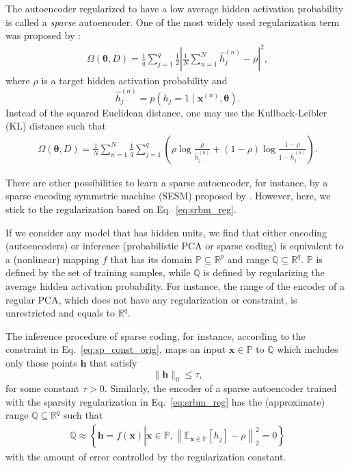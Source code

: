 \documentclass{now}
\newcommand{\vect}[1]{\mathbf{#1}}
\newcommand{\vects}[1]{\boldsymbol{#1}}
\newcommand{\vh}[0]{\vect{h}}
\newcommand{\vx}[0]{\vect{x}}
\newcommand{\TT}[0]{{\vects{\theta}}}
\newcommand{\QQ}[0]{\mathbb{Q}}
\newcommand{\PP}[0]{\mathbb{P}}
\newcommand{\RR}[0]{\mathbb{R}}
\newcommand{\E}[0]{\mathbb{E}}
\begin{document}
The autoencoder regularized to have a low average hidden activation probability
is called a \textit{sparse} autoencoder. One of the most widely used
regularization term was proposed by \citet{Lee2007}:
\begin{align}
    \label{eq:srbm_reg}
    \Omega(\TT, D) = \frac{1}{q} \sum_{j=1}^q \frac{1}{2} \left|
    \frac{1}{N} \sum_{n=1}^N \hat{h}_j^{(n)} - \rho
    \right|^2,
\end{align}
where $\rho$ is a target hidden activation probability and
\[
\hat{h}_j^{(n)} = p(h_j = 1 \mid \vx^{(n)}, \TT).
\]
Instead of the squared Euclidean distance, one may use the Kullback-Leibler (KL)
distance such that
\begin{align*}
    \Omega(\TT, D) = \frac{1}{N} \sum_{n=1}^N 
    \frac{1}{q} \sum_{j=1}^q \left( \rho \log
    \frac{\rho}{\hat{h}_j^{(n)}} + (1 - \rho) \log \frac{1 -
    \rho}{1 - \hat{h}_j^{(n)}} \right).
\end{align*}

There are other possibilities to learn a sparse autoencoder, for instance, by a
sparse encoding symmetric machine (SESM) proposed by \citet{Ranzato2008}. However, here, we stick to
the regularization based on Eq.~\eqref{eq:srbm_reg}.

If we consider any model that has hidden units, we find that either encoding
(autoencoders) or inference (probabilistic PCA or sparse coding) is equivalent
to a (nonlinear) mapping $f$ that has its domain $\PP \subseteq \RR^p$ and range
$\QQ \subseteq \RR^q$. $\PP$ is defined by the set of training samples, while
$\QQ$ is defined by regularizing the average hidden activation probability.  For
instance, the range of the encoder of a regular PCA, which does not have any
regularization or constraint, is unrestricted and equals to $\RR^q$.

The inference procedure of sparse coding, for instance, according to the
constraint in Eq.~\eqref{eq:sp_const_orig}, maps an input $\vx \in \PP$ to $\QQ$
which includes only those points $\vh$ that satisfy 
\[
    \| \vh \|_0 \leq \tau,
\]
for some constant $\tau > 0$. Similarly, the encoder of a sparse autoencoder
trained with the sparsity regularization in Eq.~\eqref{eq:srbm_reg} has the
(approximate) range $\QQ \subseteq \RR^q$ such that 
\begin{align}
    \label{eq:f_range}
    \QQ \approx \left\{\vh = f(\vx) \left| \vx \in \PP, \left\|
    \E_{\vx \in \PP}\left[ h_j \right] - \rho \right\|_2^2 =
    0 \right.\right\}
\end{align}
with the amount of error controlled by the regularization constant.
\end{document}

